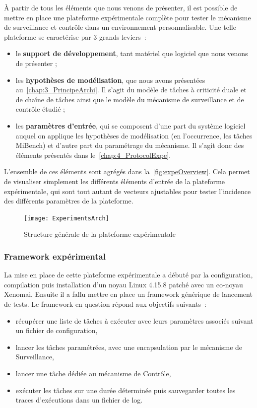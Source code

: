 \documentclass[french, a4paper, 11pt, twoside, pdftex]{StyleThese}
\begin{document}
    À partir de tous les éléments que nous venons de présenter, il est possible de mettre en place une plateforme expérimentale complète pour tester le mécanisme de surveillance et contrôle dans un environnement personnalisable. Une telle plateforme se caractérise par 3 grands leviers~: \begin{itemize}
    	\item le \textbf{support de développement}, tant matériel que logiciel que nous venons de présenter ;
    	\item les \textbf{hypothèses de modélisation}, que nous avons présentées au~\autoref{chap:3_PrincipeArchi}. Il s'agit du modèle de tâches à criticité duale et de chaîne de tâches ainsi que le modèle du mécanisme de surveillance et de contrôle étudié ;
    	\item les \textbf{paramètres d'entrée}, qui se composent d'une part du système logiciel auquel on applique les hypothèses de modélisation (en l’occurrence, les tâches MiBench) et d'autre part du paramétrage du mécanisme. Il s'agit donc des éléments présentés dans le~\autoref{chap:4_ProtocolExpe}.
    \end{itemize}
	L'ensemble de ces éléments sont agrégés dans la~\autoref{fig:expeOverview}. Cela permet de visualiser simplement les différents éléments d'entrée de la plateforme expérimentale, qui sont tout autant de vecteurs ajustables pour tester l'incidence des différents paramètres de la plateforme. 
	
	\begin{figure}[ht]
		\centering
		\texttt{[image: ExperimentsArch]}
		\caption{Structure générale de la plateforme expérimentale\label{fig:expeOverview}}
	\end{figure}

    	\subsubsection{Framework expérimental}
    
    La mise en place de cette plateforme expérimentale a débuté par la configuration, compilation puis installation d'un noyau Linux 4.15.8 patché avec un co-noyau Xenomai. Ensuite il a fallu mettre en place un framework générique de lancement de tests. Le framework en question répond aux objectifs suivants~:
    \begin{itemize}
    	\item récupérer une liste de tâches à exécuter avec leurs paramètres associés suivant un fichier de configuration,
    	\item lancer les tâches paramétrées, avec une encapsulation par le mécanisme de Surveillance,
    	\item lancer une tâche dédiée au mécanisme de Contrôle,
    	\item exécuter les tâches sur une durée déterminée puis sauvegarder toutes les traces d'exécutions dans un fichier de log.
    \end{itemize}
\end{document}
